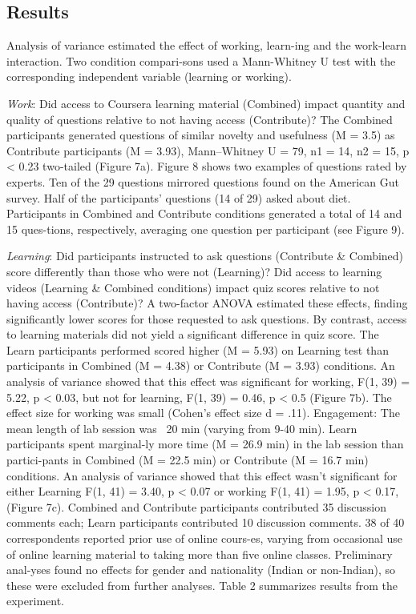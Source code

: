 \subsection{Results}
Analysis of variance estimated the effect of working, learn-ing and the work-learn interaction. Two condition compari-sons used a Mann-Whitney U test with the corresponding independent variable (learning or working). 

\textit{Work}: Did access to Coursera learning material (Combined) impact quantity and quality of questions relative to not having access (Contribute)? The Combined participants generated questions of similar novelty and usefulness (M = 3.5) as Contribute participants (M = 3.93), Mann–Whitney U = 79, n1 = 14, n2 = 15, p < 0.23 two-tailed (Figure 7a). Figure 8 shows two examples of questions rated by experts. Ten of the 29 questions mirrored questions found on the American Gut survey. Half of the participants’ questions (14 of 29) asked about diet. Participants in Combined and Contribute conditions generated a total of 14 and 15 ques-tions, respectively, averaging one question per participant (see Figure 9). 

\textit{Learning}: Did participants instructed to ask questions (Contribute \& Combined) score differently than those who were not (Learning)? Did access to learning videos (Learning \& Combined conditions) impact quiz scores relative to not having access (Contribute)? A two-factor ANOVA estimated these effects, finding significantly lower scores for those requested to ask questions. By contrast, access to learning materials did not yield a significant difference in quiz score.
The Learn participants performed scored higher (M = 5.93) on Learning test than participants in Combined (M = 4.38) or Contribute (M = 3.93) conditions. An analysis of variance showed that this effect was significant for working, F(1, 39) = 5.22, p < 0.03, but not for learning, F(1, 39) = 0.46, p < 0.5 (Figure 7b). The effect size for working was small (Cohen’s effect size d = .11).
Engagement: The mean length of lab session was ~20 min (varying from 9-40 min). Learn participants spent marginal-ly more time (M = 26.9 min) in the lab session than partici-pants in Combined (M = 22.5 min) or Contribute (M = 16.7 min) conditions. An analysis of variance showed that this effect wasn’t significant for either Learning F(1, 41) = 3.40, p < 0.07 or working F(1, 41) = 1.95, p < 0.17, (Figure 7c). Combined and Contribute participants contributed 35 discussion comments each; Learn participants contributed 10 discussion comments.
38 of 40 correspondents reported prior use of online cours-es, varying from occasional use of online learning material to taking more than five online classes. Preliminary anal-yses found no effects for gender and nationality (Indian or non-Indian), so these were excluded from further analyses. Table 2 summarizes results from the experiment. 

